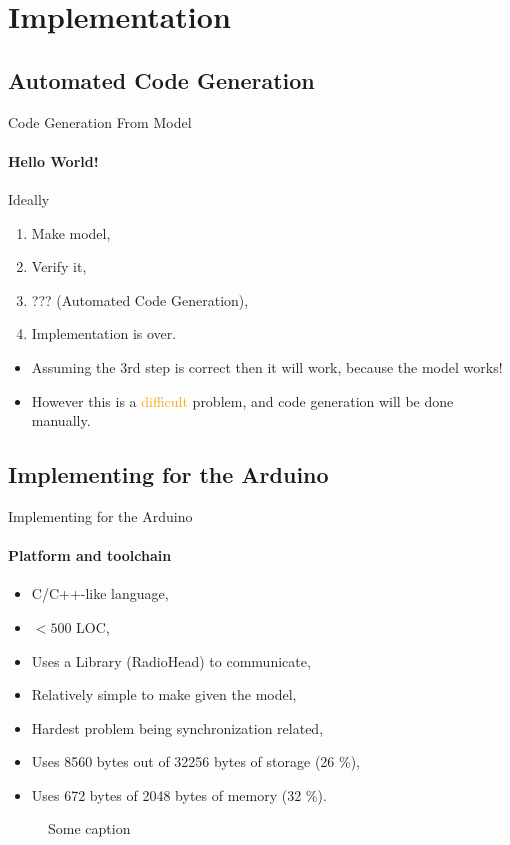 \section{Implementation}
    \subsection{Automated Code Generation}
    \begin{frame}[t]{Code Generation From Model}\framesubtitle{Hello World!}
        Ideally
        \begin{enumerate}
            \item Make model,
            \item Verify it,
            \item ??? (Automated Code Generation),
            \item Implementation is over.
        \end{enumerate}
        \bigskip
        \begin{itemize}
            \item <2->Assuming the 3rd step is correct then it will work, because the model works!
            \item <3->However this is a \textcolor{orange}{difficult} problem, and code generation will be done manually. 
        \end{itemize}
    \end{frame}
    \subsection{Implementing for the Arduino}
    \begin{frame}[t]{Implementing for the Arduino}\framesubtitle{Platform and toolchain}
        \begin{itemize}
            \item C/C++-like language,
            \item $< 500$ LOC,
            \item Uses a Library (RadioHead) to communicate,
            \item Relatively simple to make given the model,
            \item Hardest problem being synchronization related,
            \item Uses 8560 bytes out of 32256 bytes of storage (26 \%),
            \item Uses 672 bytes of 2048 bytes of memory (32 \%).
        \end{itemize}

        \begin{figure}[h]
            \centering
            \caption{Some caption}
            \label{nicefigure}
        \end{figure}
        

    \end{frame}
